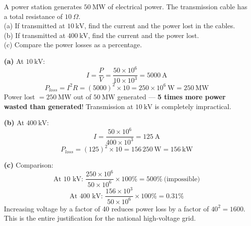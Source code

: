 \begin{diagbox}
\begin{center}
\end{center}
\end{diagbox}

\begin{examplebox}[24.4]
A power station generates $50\ \text{MW}$ of
electrical power. The transmission cable has a
total resistance of $10\ \Omega$.\\
(a) If transmitted at $10\ \text{kV}$, find the
current and the power lost in the cables.\\
(b) If transmitted at $400\ \text{kV}$, find the
current and the power lost.\\
(c) Compare the power losses as a percentage.
\end{examplebox}

\begin{solutionbox}
\textbf{(a)} At $10\ \text{kV}$:
\[
  I = \frac{P}{V} = \frac{50\times10^6}{10\times10^3}
  = 5000\ \text{A}
\]
\[
  P_{loss} = I^2R = (5000)^2 \times 10
  = 250\times10^6\ \text{W} = 250\ \text{MW}
\]
Power lost $= 250\ \text{MW}$ out of $50\ \text{MW}$
generated --- \textbf{5 times more power wasted than
generated}! Transmission at $10\ \text{kV}$ is
completely impractical.

\textbf{(b)} At $400\ \text{kV}$:
\[
  I = \frac{50\times10^6}{400\times10^3}
  = 125\ \text{A}
\]
\[
  P_{loss} = (125)^2 \times 10
  = 156\,250\ \text{W} = 156\ \text{kW}
\]

\textbf{(c)} Comparison:
\[
  \text{At 10 kV: } \frac{250\times10^6}{50\times10^6}
  \times 100\% = 500\%\ \text{(impossible)}
\]
\[
  \text{At 400 kV: } \frac{156\times10^3}
  {50\times10^6} \times 100\% = 0.31\%
\]
Increasing voltage by a factor of 40 reduces power
loss by a factor of $40^2 = 1600$. This is the
entire justification for the national high-voltage
grid.
\end{solutionbox}

